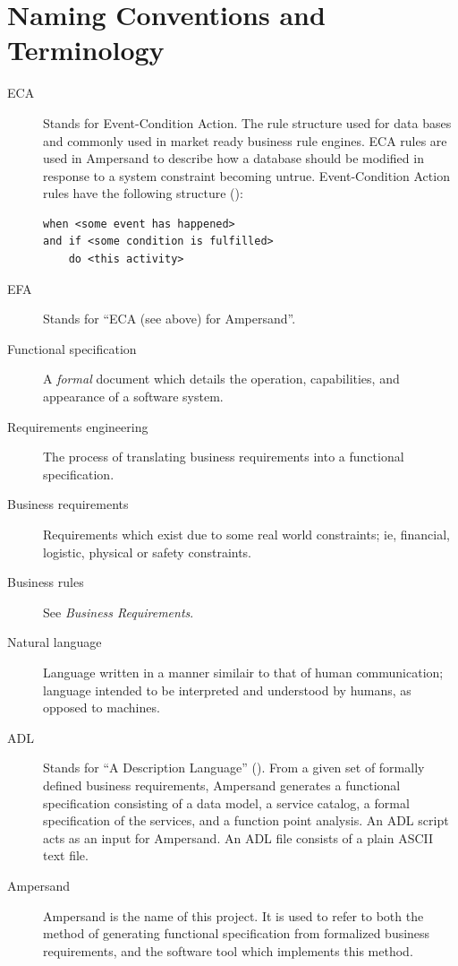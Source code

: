 \documentclass[12pt]{report}
\begin{document}
\section{Naming Conventions and Terminology}\label{sec:Naming} 
\begin{description}
\item[ECA] Stands for Event-Condition Action. The rule structure used for data
  bases and commonly used in market ready business rule engines. ECA rules are
  used in Ampersand to describe how a database should be modified in response to
  a system constraint becoming untrue. Event-Condition Action rules have
  the following structure (\cite[8--9]{RBD}):
\begin{verbatim}
when <some event has happened> 
and if <some condition is fulfilled> 
    do <this activity>
\end{verbatim} %
\item [EFA] Stands for ``ECA (see above) for Ampersand''.
\item [Functional specification] A \emph{formal} document which details the operation,
  capabilities, and appearance of a software system. 
\item [Requirements engineering] The process of translating business
  requirements into a functional specification. 
\item [Business requirements] Requirements which exist due to some real world constraints;
  ie, financial, logistic, physical or safety constraints. 
\item [Business rules] See \emph{Business Requirements}.
\item [Natural language] Language written in a manner similair to that of human communication; 
  language intended to be interpreted and understood by humans, as opposed to machines. 
\item [ADL] Stands for ``A Description Language'' (\cite[13]{derFun}). From a
  given set of formally defined business requirements, Ampersand generates a
  functional specification consisting of a data model, a service catalog, a
  formal specification of the services, and a function point analysis. An ADL
  script acts as an input for Ampersand. An ADL file consists of a plain ASCII
  text file. 
\item [Ampersand] Ampersand is the name of this project. It is used to refer to
  both the method of generating functional specification from formalized
  business requirements, and the software tool which implements this method.
\end{description}
\end{document}
